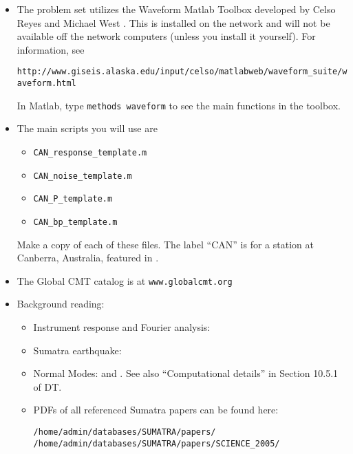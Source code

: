 \documentclass[11pt,titlepage,fleqn]{article}
\begin{document}
\begin{itemize}
\item The problem set utilizes the Waveform Matlab Toolbox developed by Celso Reyes and Michael West \citep{ReyesWest2011}. This is installed on the network and will not be available off the network computers (unless you install it yourself). For information, see

\verb+http://www.giseis.alaska.edu/input/celso/matlabweb/waveform_suite/waveform.html+

In Matlab, type \verb+methods waveform+ to see the main functions in the toolbox.


\item The main scripts you will use are
%
\begin{itemize}
\item \verb+CAN_response_template.m+
\item \verb+CAN_noise_template.m+
\item \verb+CAN_P_template.m+
\item \verb+CAN_bp_template.m+
\end{itemize}
%
Make a copy of each of these files. The label ``CAN'' is for a station at Canberra, Australia, featured in \citet[][Figure~1]{Park2005}.


\item The Global CMT catalog is at \verb+www.globalcmt.org+


\item Background reading:

\begin{itemize}
\item Instrument response and Fourier analysis: \citet[][Ch.~6]{SteinWysession}
\item Sumatra earthquake: \citep{Lay2005,Ammon2005,Park2005}
\item Normal Modes: \citet[][Section 2.9]{SteinWysession} and \citet[][Ch.~8]{DT}. See also ``Computational details'' in Section 10.5.1 of DT.
\item PDFs of all referenced Sumatra papers can be found here:

\begin{verbatim}
/home/admin/databases/SUMATRA/papers/
/home/admin/databases/SUMATRA/papers/SCIENCE_2005/
\end{verbatim}

\end{itemize}




\end{itemize}
\end{document}
